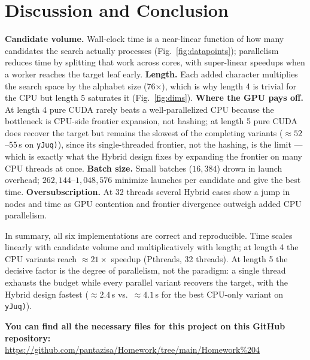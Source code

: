 \documentclass[11pt,a4paper]{article}
\begin{document}
\section{Discussion and Conclusion}
\textbf{Candidate volume.} Wall-clock time is a near-linear function of how many candidates the
search actually processes (Fig.~\ref{fig:datapoints}); parallelism reduces time by splitting that
work across cores, with super-linear speedups when a worker reaches the target leaf early.
\textbf{Length.} Each added character multiplies the search space by the alphabet size
(76$\times$), which is why length 4 is trivial for the CPU but length 5 saturates it
(Fig.~\ref{fig:dims}). \textbf{Where the GPU pays off.} At length 4 pure CUDA rarely beats a
well-parallelized CPU because the bottleneck is CPU-side frontier expansion, not hashing; at length 5
pure CUDA does recover the target but remains the slowest of the completing variants ($\approx\!52$--$55$\,s
on \texttt{yJuq)}), since its single-threaded frontier, not the hashing, is the limit --- which is
exactly what the Hybrid design fixes by expanding the frontier on many CPU threads at once.
\textbf{Batch
size.} Small batches ($16{,}384$) drown in launch overhead; $262{,}144$--$1{,}048{,}576$ minimize
launches per candidate and give the best time. \textbf{Oversubscription.} At 32 threads several
Hybrid cases show a jump in nodes and time as GPU contention and frontier divergence outweigh added
CPU parallelism.

\medskip
\noindent In summary, all six implementations are correct and reproducible. Time scales linearly with
candidate volume and multiplicatively with length; at length 4 the CPU variants reach
$\approx21\times$ speedup (Pthreads, 32 threads). At length 5 the decisive factor is the degree of
parallelism, not the paradigm: a single thread exhausts the budget while every parallel variant
recovers the target, with the Hybrid design fastest ($\approx\!2.4$\,s vs.\ $\approx\!4.1$\,s for the best
CPU-only variant on \texttt{yJuq)}).

\vspace{0.4em}
\noindent\textbf{You can find all the necessary files for this project on this GitHub repository:} \\
\url{https://github.com/pantazisa/Homework/tree/main/Homework%204}
\end{document}
